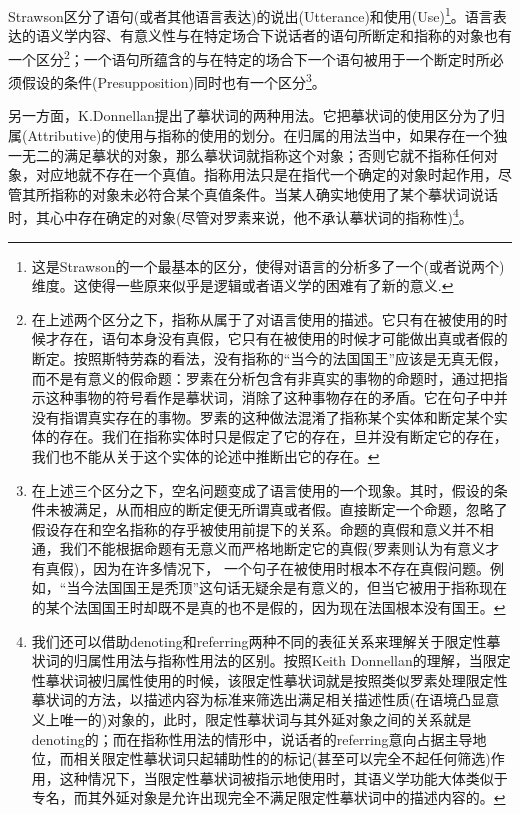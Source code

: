 \documentclass{article}
\begin{document}
Strawson区分了语句(或者其他语言表达)的说出(Utterance)和使用(Use)\footnote{这是Strawson的一个最基本的区分，使得对语言的分析多了一个(或者说两个)维度。这使得一些原来似乎是逻辑或者语义学的困难有了新的意义.}。语言表达的语义学内容、有意义性与在特定场合下说话者的语句所断定和指称的对象也有一个区分\footnote{在上述两个区分之下，指称从属于了对语言使用的描述。它只有在被使用的时候才存在，语句本身没有真假，它只有在被使用的时候才可能做出真或者假的断定。按照斯特劳森的看法，没有指称的“当今的法国国王”应该是无真无假，而不是有意义的假命题：罗素在分析包含有非真实的事物的命题时，通过把指示这种事物的符号看作是摹状词，消除了这种事物存在的矛盾。它在句子中并没有指谓真实存在的事物。罗素的这种做法混淆了指称某个实体和断定某个实体的存在。我们在指称实体时只是假定了它的存在，旦并没有断定它的存在，我们也不能从关于这个实体的论述中推断出它的存在。}；一个语句所蕴含的与在特定的场合下一个语句被用于一个断定时所必须假设的条件(Presupposition)同时也有一个区分\footnote{在上述三个区分之下，空名问题变成了语言使用的一个现象。其时，假设的条件未被满足，从而相应的断定便无所谓真或者假。直接断定一个命题，忽略了假设存在和空名指称的存乎被使用前提下的关系。命题的真假和意义并不相通，我们不能根据命题有无意义而严格地断定它的真假(罗素则认为有意义才有真假)，因为在许多情况下， 一个句子在被使用时根本不存在真假问题。例如，“当今法国国王是秃顶”这句话无疑余是有意义的，但当它被用于指称现在的某个法国国王时却既不是真的也不是假的，因为现在法国根本没有国王。}。

另一方面，K.Donnellan提出了摹状词的两种用法。它把摹状词的使用区分为了归属(Attributive)的使用与指称的使用的划分。在归属的用法当中，如果存在一个独一无二的满足摹状的对象，那么摹状词就指称这个对象；否则它就不指称任何对象，对应地就不存在一个真值。指称用法只是在指代一个确定的对象时起作用，尽管其所指称的对象未必符合某个真值条件。当某人确实地使用了某个摹状词说话时，其心中存在确定的对象(尽管对罗素来说，他不承认摹状词的指称性)\footnote{我们还可以借助denoting和referring两种不同的表征关系来理解关于限定性摹状词的归属性用法与指称性用法的区别。按照Keith Donnellan的理解，当限定性摹状词被归属性使用的时候，该限定性摹状词就是按照类似罗素处理限定性摹状词的方法，以描述内容为标准来筛选出满足相关描述性质(在语境凸显意义上唯一的)对象的，此时，限定性摹状词与其外延对象之间的关系就是denoting的；而在指称性用法的情形中，说话者的referring意向占据主导地位，而相关限定性摹状词只起辅助性的的标记(甚至可以完全不起任何筛选)作用，这种情况下，当限定性摹状词被指示地使用时，其语义学功能大体类似于专名，而其外延对象是允许出现完全不满足限定性摹状词中的描述内容的。}。
\end{document}
